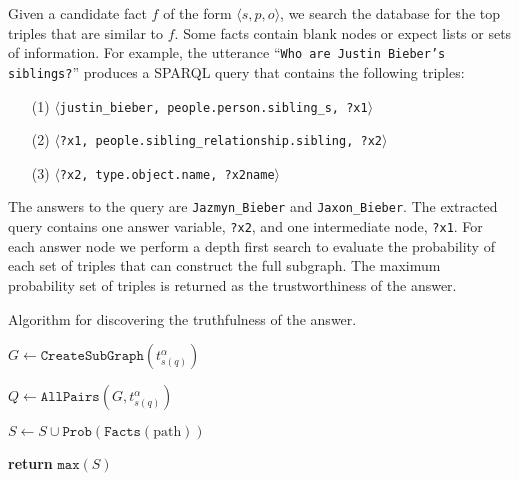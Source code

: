 Given a candidate fact \(f\) of the form \(\langle s, p, o \rangle\), we search
the database for the top triples that are similar to \(f\).
Some facts contain blank nodes or expect lists or sets of information.
For example, the utterance ``\texttt{Who are Justin Bieber's siblings?}'' produces 
a SPARQL query that contains the following triples: 
\begin{enumerate}
\item[(1)] \(\langle\)\texttt{justin\_bieber, people.person.sibling\_s, ?x1}\(\rangle\)
\item[(2)] \(\langle\)\texttt{?x1, people.sibling\_relationship.sibling, ?x2}\(\rangle\)
\item[(3)] \(\langle\)\texttt{?x2, type.object.name, ?x2name}\(\rangle\)
\end{enumerate}

The answers to the query are \texttt{Jazmyn\_Bieber} and \texttt{Jaxon\_Bieber}.
The extracted query contains one answer variable, \texttt{?x2}, and one intermediate node, \texttt{?x1}.
For each answer node we perform a depth first
search to evaluate the probability of each set of triples that can construct
the full subgraph.
The maximum probability set of triples is returned as the trustworthiness of the answer.


\begin{algorithm}
\caption{Algorithm for discovering the truthfulness of the answer.}
\label{alg:probqa-truthfulness}
\begin{algorithmic}[1]

\State $G \leftarrow \mathtt{CreateSubGraph}(t_{s(q)}^\alpha)$ \label{algo:line:createsubgraph}

\State $Q \leftarrow \mathtt{AllPairs}(G, t_{s(q)}^\alpha)$  \label{algo:line:allpairs}

  \label{algo:line:jointprob-start}
  \State $S \leftarrow S \cup \mathtt{Prob}(\mathtt{Facts}(\text{path}))$ 
\EndFor \label{algo:line:jointprob-end}

\State \textbf{return} $\mathtt{max}(S)$
\EndProcedure
\end{algorithmic}
\end{algorithm}

